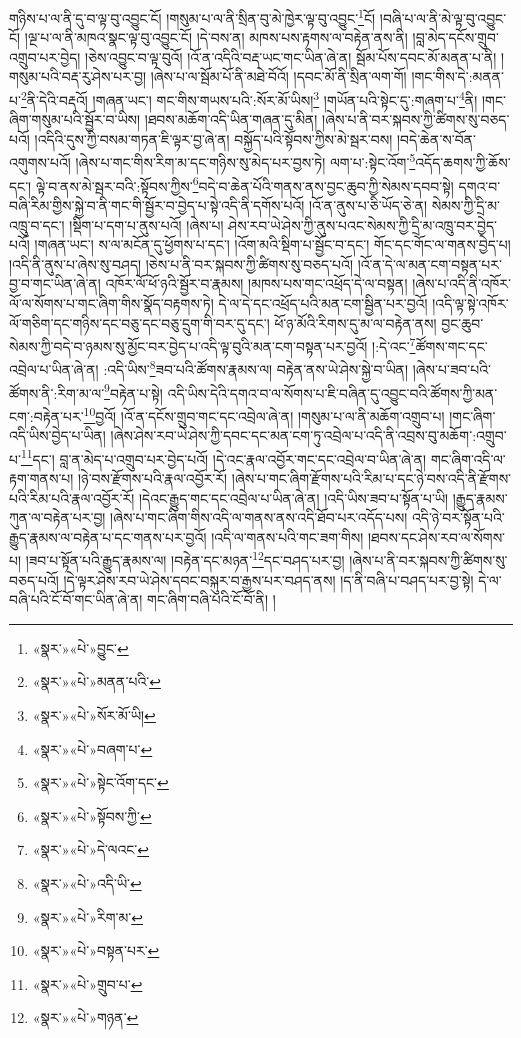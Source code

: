 གཉིས་པ་ལ་ནི་དུ་བ་ལྟ་བུ་འབྱུང་ངོ། །གསུམ་པ་ལ་ནི་སྲིན་བུ་མེ་ཁྱེར་ལྟ་བུ་འབྱུང་\footnote{«སྣར་»«པེ་»བྱུང་}ངོ། །བཞི་པ་ལ་ནི་མེ་ལྟ་བུ་འབྱུང་ངོ། །ལྔ་པ་ལ་ནི་མཁའ་སྣང་ལྟ་བུ་འབྱུང་ངོ། །དེ་བས་ན། མཁས་པས་རྟགས་ལ་བརྟེན་ནས་ནི། །བླ་མེད་དངོས་གྲུབ་འགྲུབ་པར་བྱེད། །ཅེས་འབྱུང་བ་ལྟ་བུའོ། །འོ་ན་འདིའི་བརྡ་ཡང་གང་ཡིན་ཞེ་ན། སྦོམ་པོས་དབང་མོ་མནན་པ་ནི། །གསུམ་པའི་བརྡ་རུ་ཤེས་པར་བྱ། །ཞེས་པ་ལ་སྦོམ་པོ་ནི་མཐེ་བོའོ། །དབང་མོ་ནི་སྲིན་ལག་གོ། །གང་གིས་དེ་:མནན་པ་\footnote{«སྣར་»«པེ་»མནན་པའི་}ནི་དེའི་བརྡའོ། །གཞན་ཡང་། གང་གིས་གཡས་པའི་:སོར་མོ་ཡིས།\footnote{«སྣར་»«པེ་»སོར་མོ་ཡི།} །གཡོན་པའི་སྟེང་དུ་:གཞག་པ་\footnote{«སྣར་»«པེ་»བཞག་པ་}ནི། །གང་ཞིག་གསུམ་པའི་སྦྱོར་བ་ཡིས། །ཐབས་མཆོག་འདི་ཡིན་གཞན་དུ་མིན། །ཞེས་པ་ནི་བར་སྐབས་ཀྱི་ཚིགས་སུ་བཅད་པའོ། །འདིའི་དུས་ཀྱི་བསམ་གཏན་ཇི་ལྟར་བྱ་ཞེ་ན། བསྐྱོད་པའི་སྟོབས་ཀྱིས་མེ་སྦར་བས། །བདེ་ཆེན་ས་བོན་འགུགས་པའོ། །ཞེས་པ་གང་གིས་རིག་མ་དང་གཉིས་སུ་མེད་པར་བྱས་ཏེ། ལག་པ་:སྟེང་འོག་\footnote{«སྣར་»«པེ་»སྟེང་འོག་དང་}འདོད་ཆགས་ཀྱི་ཆོས་དང་། ལྟེ་བ་ནས་མེ་སྦར་བའི་:སྟོབས་ཀྱིས་\footnote{«སྣར་»«པེ་»སྟོབས་ཀྱི་}བདེ་བ་ཆེན་པོའི་གནས་ནས་བྱང་ཆུབ་ཀྱི་སེམས་དབབ་སྟེ། དགའ་བ་བཞི་རིམ་གྱིས་སྐྱེ་བ་ནི་གང་གི་སྦྱོར་བ་བྱེད་པ་སྟེ་འདི་ནི་དགོས་པའོ། །འོ་ན་ནུས་པ་ཅི་ཡོད་ཅེ་ན། སེམས་ཀྱི་དྲི་མ་འཁྲུ་བ་དང་། །སྡིག་པ་དག་པ་ནུས་པའོ། །ཞེས་པ། ཤེས་རབ་ཡེ་ཤེས་ཀྱི་ནུས་པའང་སེམས་ཀྱི་དྲི་མ་འཁྲུ་བར་བྱེད་པའོ། །གཞན་ཡང་། ས་ལ་མངོན་དུ་ཕྱོགས་པ་དང་། །འོག་མའི་སྡིག་པ་སྦྱོང་བ་དང་། གོང་དང་གོང་ལ་གནས་བྱེད་པ། །འདི་ནི་ནུས་པ་ཞེས་སུ་བཤད། །ཅེས་པ་ནི་བར་སྐབས་ཀྱི་ཚིགས་སུ་བཅད་པའོ། །འོ་ན་དེ་ལ་མན་ངག་བསྟན་པར་བྱ་བ་གང་ཡིན་ཞེ་ན། འཁོར་ལོ་ཕོ་ཉའི་སྦྱོར་བ་རྣམས། །མཁས་པས་གང་འཕྲོད་དེ་ལ་བསྟན། །ཞེས་པ་འདི་ནི་འཁོར་ལོ་ལ་སོགས་པ་གང་ཞིག་གིས་སྣོད་བརྟགས་ཏེ། དེ་ལ་དེ་དང་འཕྲོད་པའི་མན་ངག་སྦྱིན་པར་བྱའོ། །འདི་ལྟ་སྟེ་འཁོར་ལོ་གཅིག་དང་གཉིས་དང་བཅུ་དང་བཅུ་དྲུག་གི་བར་དུ་དང་། ཕོ་ཉ་མོའི་རིགས་དུ་མ་ལ་བརྟེན་ནས། བྱང་ཆུབ་སེམས་ཀྱི་བདེ་བ་ཉམས་སུ་མྱོང་བར་བྱེད་པ་འདི་ལྟ་བུའི་མན་ངག་བསྟན་པར་བྱའོ། །:དེ་འང་\footnote{«སྣར་»«པེ་»དེ་ལའང་}ཚོགས་གང་དང་འབྲེལ་པ་ཡིན་ཞེ་ན། :འདི་ཡིས་\footnote{«སྣར་»«པེ་»འདི་ཡི་}ཟབ་པའི་ཚོགས་རྣམས་ལ། བརྟེན་ནས་ཡེ་ཤེས་སྐྱེ་བ་ཡིན། །ཞེས་པ་ཟབ་པའི་ཚོགས་ནི་:རིག་མ་ལ་\footnote{«སྣར་»«པེ་»རིག་མ་}བརྟེན་པ་སྟེ། འདི་ཡིས་དེའི་དགའ་བ་ལ་སོགས་པ་ཇི་བཞིན་དུ་འབྱུང་བའི་ཚོགས་ཀྱི་མན་ངག་:བརྟེན་པར་\footnote{«སྣར་»«པེ་»བསྟན་པར་}བྱའོ། །འོ་ན་དངོས་གྲུབ་གང་དང་འབྲེལ་ཞེ་ན། །གསུམ་པ་ལ་ནི་མཆོག་འགྲུབ་པ། །གང་ཞིག་འདི་ཡིས་བྱེད་པ་ཡིན། །ཞེས་ཤེས་རབ་ཡེ་ཤེས་ཀྱི་དབང་དང་མན་ངག་ཏུ་འབྲེལ་པ་འདི་ནི་འབྲས་བུ་མཆོག་:འགྲུབ་པ་\footnote{«སྣར་»«པེ་»གྲུབ་པ་}དང་། བླ་ན་མེད་པ་འགྲུབ་པར་བྱེད་པའོ། །དེ་འང་རྣལ་འབྱོར་གང་དང་འབྲེལ་བ་ཡིན་ཞེ་ན། གང་ཞིག་འདི་ལ་རྟག་གནས་པ། །ཉེ་བས་རྫོགས་པའི་རྣལ་འབྱོར་རོ། །ཞེས་པ་གང་ཞིག་རྫོགས་པའི་རིམ་པ་དང་ཉེ་བས་འདི་ནི་རྫོགས་པའི་རིམ་པའི་རྣལ་འབྱོར་རོ། །དེའང་རྒྱུད་གང་དང་འབྲེལ་པ་ཡིན་ཞེ་ན། །འདི་ཡིས་ཟབ་པ་སྟོན་པ་ཡི། །རྒྱུད་རྣམས་ཀུན་ལ་བརྟེན་པར་བྱ། །ཞེས་པ་གང་ཞིག་གིས་འདི་ལ་གནས་ནས་འདི་ཐོབ་པར་འདོད་པས། འདི་ཉེ་བར་སྟོན་པའི་རྒྱུད་རྣམས་ལ་བརྟེན་པ་དང་གནས་པར་བྱའོ། །འདི་ལ་གནས་པའི་གང་ཟག་གིས། །ཐབས་དང་ཤེས་རབ་ལ་སོགས་པ། །ཟབ་པ་སྟོན་པའི་རྒྱུད་རྣམས་ལ། །བརྟེན་དང་མཉན་\footnote{«སྣར་»«པེ་»གཉན་}དང་བཤད་པར་བྱ། །ཞེས་པ་ནི་བར་སྐབས་ཀྱི་ཚིགས་སུ་བཅད་པའོ། །དེ་ལྟར་ཤེས་རབ་ཡེ་ཤེས་དབང་བསྐུར་བ་རྒྱས་པར་བཤད་ནས། །ད་ནི་བཞི་པ་བཤད་པར་བྱ་སྟེ། དེ་ལ་བཞི་པའི་ངོ་བོ་གང་ཡིན་ཞེ་ན། གང་ཞིག་བཞི་པའི་ངོ་བོ་ནི། །
